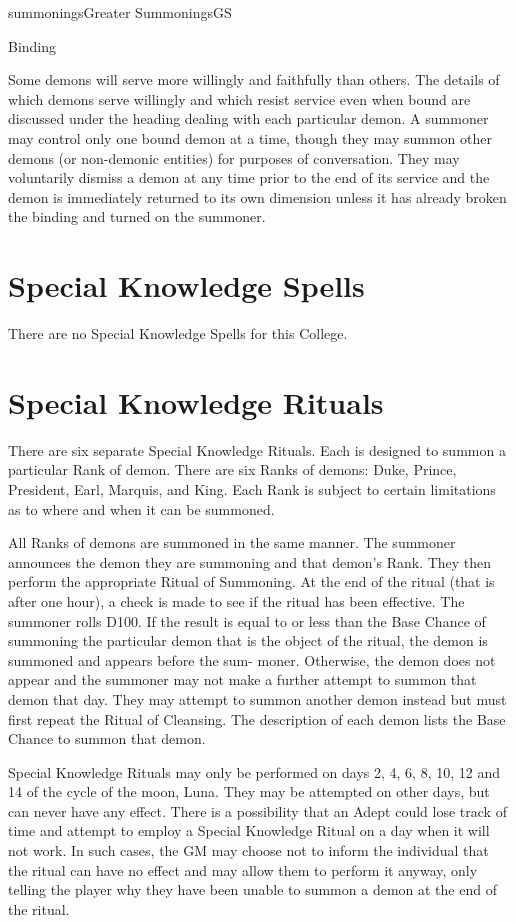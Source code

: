 \begin{College}[1.0]{summonings}{Greater Summonings}{GS}
\begin{ritual}[Q-6]{Binding}
\begin{effects}
Some demons will serve more willingly and faithfully than others.  The
details of which demons serve willingly and which resist service even
when bound are discussed under the heading dealing with each
particular demon.  A summoner may control only one bound demon at a
time, though they may summon other demons (or non-demonic entities)
for purposes of conversation.  They may voluntarily dismiss a demon at
any time prior to the end of its service and the demon is immediately
returned to its own dimension unless it has already broken the binding
and turned on the summoner.

\end{effects}
\end{ritual}

\section{Special Knowledge Spells}

There are no Special Knowledge Spells for this College.


\section{Special Knowledge Rituals}

There are six separate Special Knowledge Rituals.  Each is designed to
summon a particular Rank of demon.  There are six Ranks of demons:
Duke, Prince, President, Earl, Marquis, and King.  Each Rank is
subject to certain limitations as to where and when it can be
summoned.

All Ranks of demons are summoned in the same manner. The summoner
announces the demon they are summoning and that demon’s Rank. They
then perform the appropriate Ritual of Summoning.  At the end of the
ritual (that is after one hour), a check is made to see if the ritual
has been effective. The summoner rolls D100.  If the result is equal
to or less than the Base Chance of summoning the particular demon that
is the object of the ritual, the demon is summoned and appears before
the sum- moner. Otherwise, the demon does not appear and the summoner
may not make a further attempt to summon that demon that day. They may
attempt to summon another demon instead but must first repeat the
Ritual of Cleansing.  The description of each demon lists the Base
Chance to summon that demon.

Special Knowledge Rituals may only be performed on days 2, 4, 6, 8,
10, 12 and 14 of the cycle of the moon, Luna. They may be attempted on
other days, but can never have any effect. There is a possibility that
an Adept could lose track of time and attempt to employ a Special
Knowledge Ritual on a day when it will not work.  In such cases, the
GM may choose not to inform the individual that the ritual can have no
effect and may allow them to perform it anyway, only telling the
player why they have been unable to summon a demon at the end of the
ritual.


\end{College}
